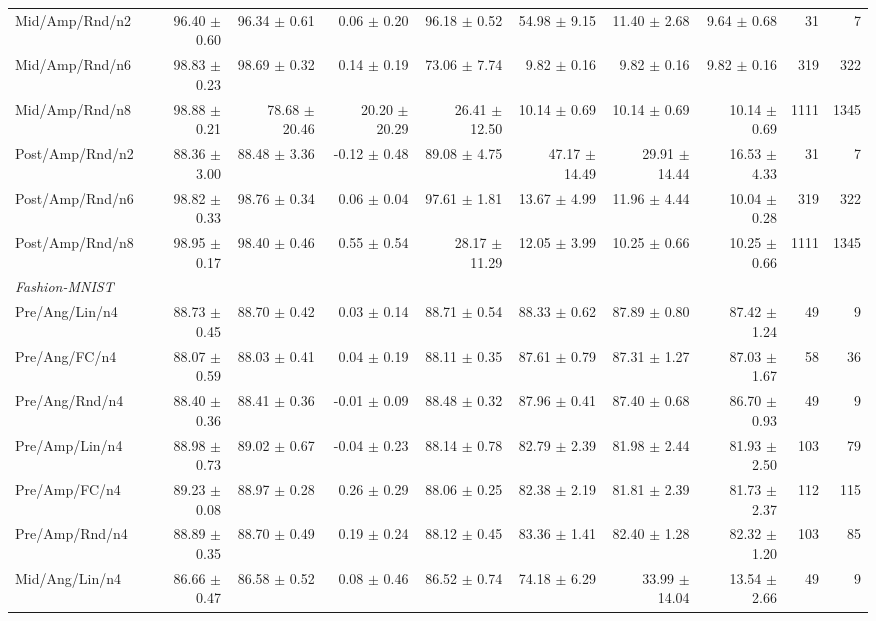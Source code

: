 \begin{table}[!t]
\begin{tabular}{lrrrrrrrrr}
Mid/Amp/Rnd/n2 & 96.40 $\pm$ 0.60 & 96.34 $\pm$ 0.61 & 0.06 $\pm$ 0.20 & 96.18 $\pm$ 0.52 & 54.98 $\pm$ 9.15 & 11.40 $\pm$ 2.68 & 9.64 $\pm$ 0.68 & 31 & 7 \\
Mid/Amp/Rnd/n6 & 98.83 $\pm$ 0.23 & 98.69 $\pm$ 0.32 & 0.14 $\pm$ 0.19 & 73.06 $\pm$ 7.74 & 9.82 $\pm$ 0.16 & 9.82 $\pm$ 0.16 & 9.82 $\pm$ 0.16 & 319 & 322 \\
Mid/Amp/Rnd/n8 & 98.88 $\pm$ 0.21 & 78.68 $\pm$ 20.46 & 20.20 $\pm$ 20.29 & 26.41 $\pm$ 12.50 & 10.14 $\pm$ 0.69 & 10.14 $\pm$ 0.69 & 10.14 $\pm$ 0.69 & 1111 & 1345 \\
Post/Amp/Rnd/n2 & 88.36 $\pm$ 3.00 & 88.48 $\pm$ 3.36 & -0.12 $\pm$ 0.48 & 89.08 $\pm$ 4.75 & 47.17 $\pm$ 14.49 & 29.91 $\pm$ 14.44 & 16.53 $\pm$ 4.33 & 31 & 7 \\
Post/Amp/Rnd/n6 & 98.82 $\pm$ 0.33 & 98.76 $\pm$ 0.34 & 0.06 $\pm$ 0.04 & 97.61 $\pm$ 1.81 & 13.67 $\pm$ 4.99 & 11.96 $\pm$ 4.44 & 10.04 $\pm$ 0.28 & 319 & 322 \\
Post/Amp/Rnd/n8 & 98.95 $\pm$ 0.17 & 98.40 $\pm$ 0.46 & 0.55 $\pm$ 0.54 & 28.17 $\pm$ 11.29 & 12.05 $\pm$ 3.99 & 10.25 $\pm$ 0.66 & 10.25 $\pm$ 0.66 & 1111 & 1345 \\
\midrule
\multicolumn{10}{l}{\textit{Fashion-MNIST}} \\
Pre/Ang/Lin/n4 & 88.73 $\pm$ 0.45 & 88.70 $\pm$ 0.42 & 0.03 $\pm$ 0.14 & 88.71 $\pm$ 0.54 & 88.33 $\pm$ 0.62 & 87.89 $\pm$ 0.80 & 87.42 $\pm$ 1.24 & 49 & 9 \\
Pre/Ang/FC/n4 & 88.07 $\pm$ 0.59 & 88.03 $\pm$ 0.41 & 0.04 $\pm$ 0.19 & 88.11 $\pm$ 0.35 & 87.61 $\pm$ 0.79 & 87.31 $\pm$ 1.27 & 87.03 $\pm$ 1.67 & 58 & 36 \\
Pre/Ang/Rnd/n4 & 88.40 $\pm$ 0.36 & 88.41 $\pm$ 0.36 & -0.01 $\pm$ 0.09 & 88.48 $\pm$ 0.32 & 87.96 $\pm$ 0.41 & 87.40 $\pm$ 0.68 & 86.70 $\pm$ 0.93 & 49 & 9 \\
Pre/Amp/Lin/n4 & 88.98 $\pm$ 0.73 & 89.02 $\pm$ 0.67 & -0.04 $\pm$ 0.23 & 88.14 $\pm$ 0.78 & 82.79 $\pm$ 2.39 & 81.98 $\pm$ 2.44 & 81.93 $\pm$ 2.50 & 103 & 79 \\
Pre/Amp/FC/n4 & 89.23 $\pm$ 0.08 & 88.97 $\pm$ 0.28 & 0.26 $\pm$ 0.29 & 88.06 $\pm$ 0.25 & 82.38 $\pm$ 2.19 & 81.81 $\pm$ 2.39 & 81.73 $\pm$ 2.37 & 112 & 115 \\
Pre/Amp/Rnd/n4 & 88.89 $\pm$ 0.35 & 88.70 $\pm$ 0.49 & 0.19 $\pm$ 0.24 & 88.12 $\pm$ 0.45 & 83.36 $\pm$ 1.41 & 82.40 $\pm$ 1.28 & 82.32 $\pm$ 1.20 & 103 & 85 \\
Mid/Ang/Lin/n4 & 86.66 $\pm$ 0.47 & 86.58 $\pm$ 0.52 & 0.08 $\pm$ 0.46 & 86.52 $\pm$ 0.74 & 74.18 $\pm$ 6.29 & 33.99 $\pm$ 14.04 & 13.54 $\pm$ 2.66 & 49 & 9 \\

\end{tabular}
\end{table}

